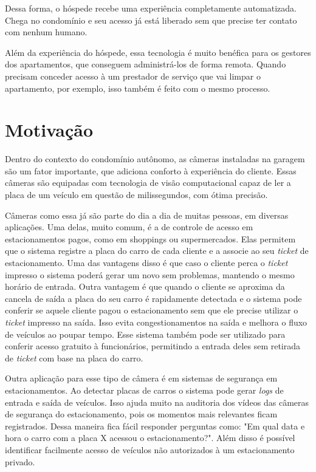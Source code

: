 Dessa forma, o hóspede recebe uma experiência completamente automatizada. Chega no condomínio e seu acesso já está liberado sem que precise ter contato com nenhum humano.

Além da experiência do hóspede, essa tecnologia é muito benéfica para os gestores dos apartamentos, que conseguem administrá-los de forma remota. Quando precisam conceder acesso à um prestador de serviço que vai limpar o apartamento, por exemplo, isso também é feito com o mesmo processo.

\section{Motivação}

Dentro do contexto do condomínio autônomo, as câmeras instaladas na garagem são um fator importante, que adiciona conforto à experiência do cliente. Essas câmeras são equipadas com tecnologia de visão computacional capaz de ler a placa de um veículo em questão de milissegundos, com ótima precisão.

Câmeras como essa já são parte do dia a dia de muitas pessoas, em diversas aplicações. Uma delas, muito comum, é a de controle de acesso em estacionamentos pagos, como em shoppings ou supermercados. Elas permitem que o sistema registre a placa do carro de cada cliente e a associe ao seu \textit{ticket} de estacionamento. Uma das vantagens disso é que caso o cliente perca o \textit{ticket} impresso o sistema poderá gerar um novo sem problemas, mantendo o mesmo horário de entrada. Outra vantagem é que quando o cliente se aproxima da cancela de saída a placa do seu carro é rapidamente detectada e o sistema pode conferir se aquele cliente pagou o estacionamento sem que ele precise utilizar o \textit{ticket} impresso na saída. Isso evita congestionamentos na saída e melhora o fluxo de veículos ao poupar tempo. Esse sistema também pode ser utilizado para conferir acesso gratuito à funcionários, permitindo a entrada deles sem retirada de \textit{ticket} com base na placa do carro.

Outra aplicação para esse tipo de câmera é em sistemas de segurança em estacionamentos. Ao detectar placas de carros o sistema pode gerar \textit{logs} de entrada e saída de veículos. Isso ajuda muito na auditoria dos vídeos das câmeras de segurança do estacionamento, pois os momentos mais relevantes ficam registrados. Dessa maneira fica fácil responder perguntas como: "Em qual data e hora o carro com a placa X acessou o estacionamento?". Além disso é possível identificar facilmente acesso de veículos não autorizados à um estacionamento privado.

